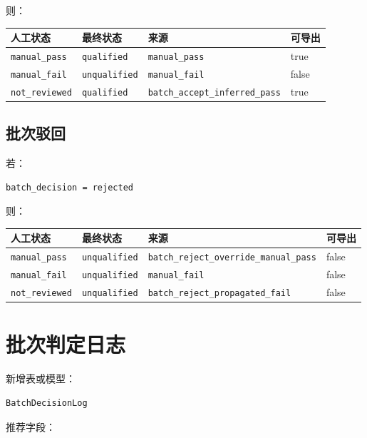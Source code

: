 \documentclass[UTF8,12pt,a4paper]{ctexart}
\begin{document}
则：

\begin{longtable}{p{4cm}p{4cm}p{5cm}p{2cm}}
\toprule
人工状态 & 最终状态 & 来源 & 可导出 \\
\midrule
\texttt{manual\_pass} & \texttt{qualified} & \texttt{manual\_pass} & true \\
\texttt{manual\_fail} & \texttt{unqualified} & \texttt{manual\_fail} & false \\
\texttt{not\_reviewed} & \texttt{qualified} & \texttt{batch\_accept\_inferred\_pass} & true \\
\bottomrule
\end{longtable}

\subsection{批次驳回}

若：

\begin{lstlisting}
batch_decision = rejected
\end{lstlisting}

则：

\begin{longtable}{p{4cm}p{4cm}p{5cm}p{2cm}}
\toprule
人工状态 & 最终状态 & 来源 & 可导出 \\
\midrule
\texttt{manual\_pass} & \texttt{unqualified} & \texttt{batch\_reject\_override\_manual\_pass} & false \\
\texttt{manual\_fail} & \texttt{unqualified} & \texttt{manual\_fail} & false \\
\texttt{not\_reviewed} & \texttt{unqualified} & \texttt{batch\_reject\_propagated\_fail} & false \\
\bottomrule
\end{longtable}

\section{批次判定日志}

新增表或模型：

\begin{lstlisting}
BatchDecisionLog
\end{lstlisting}

推荐字段：
\end{document}
